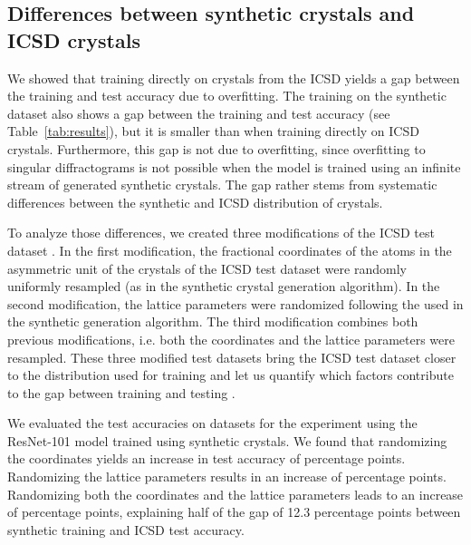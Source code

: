     \subsection{Differences between synthetic crystals and ICSD crystals}
    We showed that training directly on crystals from the ICSD yields a gap
    between the training and test accuracy due to overfitting. The training on
    the synthetic dataset also shows a gap between the training and test
    accuracy (see Table~\ref{tab:results}), but it is smaller than when training
    directly on ICSD crystals. Furthermore, this gap is not due to overfitting,
    since overfitting to singular diffractograms is not possible when the model
    is trained using an infinite stream of generated synthetic crystals. The gap
    rather stems from systematic differences between the synthetic and ICSD
    distribution of crystals.

    To analyze those differences, we created three modifications of the ICSD
    test dataset . In the first modification, the fractional coordinates of the
    atoms in the asymmetric unit of the crystals of the ICSD test dataset were
    randomly uniformly resampled (as in the synthetic crystal generation
    algorithm). In the second modification, the lattice parameters were
    randomized following the  used in the synthetic generation algorithm. The
    third modification combines both previous modifications, i.e. both the
    coordinates and the lattice parameters were resampled. These three modified
    test datasets bring the ICSD test dataset closer to the distribution used
    for training and let us quantify which factors contribute to the gap between
    training  and testing . 

    We evaluated the test accuracies on 
    datasets for the experiment using the ResNet-101 model trained using
    synthetic crystals. We found that randomizing the coordinates yields an
    increase in test accuracy of  percentage points.
    Randomizing the lattice parameters results in an increase of
     percentage points. Randomizing both the
    coordinates and the lattice parameters leads to an increase of
     percentage points, explaining
     half of the gap of 12.3 percentage points
    between synthetic training and ICSD test accuracy.

